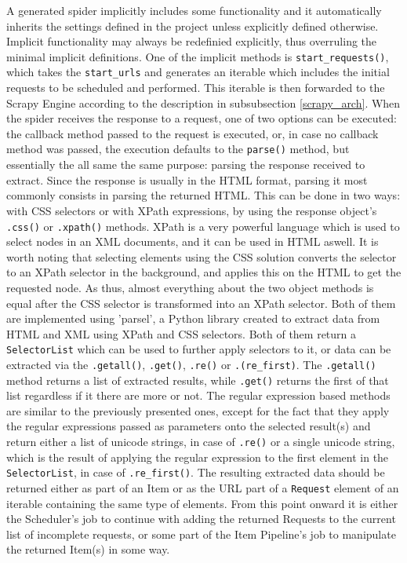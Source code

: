 \documentclass[12pt,a4paper,twoside]{report}
\begin{document}
A generated spider implicitly includes some functionality and it automatically inherits the settings defined in the project unless explicitly defined otherwise. Implicit functionality may always be redefinied explicitly, thus overruling the minimal implicit definitions. One of the implicit methods is \lstinline$start_requests()$, which takes the \lstinline$start_urls$ and generates an iterable which includes the initial requests to be scheduled and performed. This iterable is then forwarded to the Scrapy Engine according to the description in subsubsection \ref{scrapy_arch}. When the spider receives the response to a request, one of two options can be executed: the callback method passed to the request is executed, or, in case no callback method was passed, the execution defaults to the \lstinline$parse()$ method, but essentially the all same the same purpose: parsing the response received to extract. Since the response is usually in the HTML format, parsing it most commonly consists in parsing the returned HTML. This can be done in two ways: with CSS selectors or with XPath expressions, by using the response object's \lstinline$.css()$ or \lstinline$.xpath()$ methods. XPath is a very powerful language which is used to select nodes in an XML documents, and it can be used in HTML aswell. It is worth noting that selecting elements using the CSS solution converts the selector to an XPath selector in the background, and applies this on the HTML to get the requested node. As thus, almost everything about the two object methods is equal after the CSS selector is transformed into an XPath selector. Both of them are implemented using 'parsel', a Python library created to extract data from HTML and XML using XPath and CSS selectors. Both of them return a \lstinline$SelectorList$ which can be used to further apply selectors to it, or data can be extracted via the \lstinline$.getall()$, \lstinline$.get()$, \lstinline$.re()$ or \lstinline$.(re_first)$. The \lstinline$.getall()$ method returns a list of extracted results, while \lstinline$.get()$ returns the first of that list regardless if it there are more or not. The regular expression based  methods are similar to the previously presented ones, except for the fact that they apply the regular expressions passed as parameters onto the selected result(s) and return either a list of unicode strings, in case of \lstinline$.re()$ or a single unicode string, which is the result of applying the regular expression to the first element in the \lstinline$SelectorList$, in case of \lstinline$.re_first()$. The resulting extracted data should be returned either as part of an Item or as the URL part of a \lstinline$Request$ element of an iterable containing the same type of elements. From this point onward it is either the Scheduler's job to continue with adding the returned Requests to the current list of incomplete requests, or some part of the Item Pipeline's job to manipulate the returned Item(s) in some way.
\end{document}
